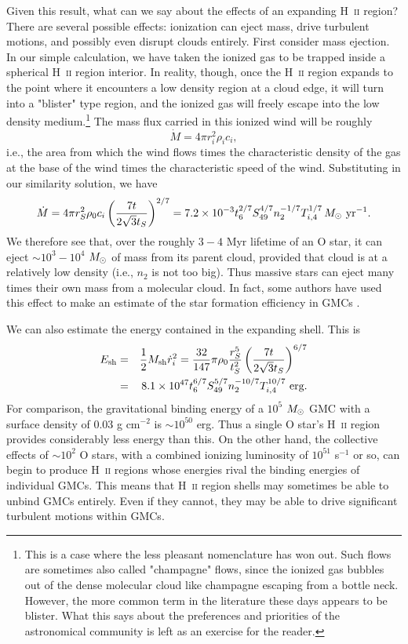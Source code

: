 Given this result, what can we say about the effects of an expanding H~\textsc{ii} region? There are several possible effects: ionization can eject mass, drive turbulent motions, and possibly even disrupt clouds entirely. First consider mass ejection. In our simple calculation, we have taken the ionized gas to be trapped inside a spherical H~\textsc{ii} region interior. In reality, though, once the H~\textsc{ii} region expands to the point where it encounters a low density region at a cloud edge, it will turn into a "blister" type region, and the ionized gas will freely escape into the low density medium.\footnote{This is a case where the less pleasant nomenclature has won out. Such flows are sometimes also called "champagne" flows, since the ionized gas bubbles out of the dense molecular cloud like champagne escaping from a bottle neck. However, the more common term in the literature these days appears to be blister. What this says about the preferences and priorities of the astronomical community is left as an exercise for the reader.} The mass flux carried in this ionized wind will be roughly
\begin{equation}
\dot{M} = 4\pi r_i^2 \rho_i c_i,
\end{equation}
i.e., the area from which the wind flows times the characteristic density of the gas at the base of the wind times the characteristic speed of the wind. Substituting in our similarity solution, we have
\begin{equation}
\dot{M} = 4\pi r_S^2 \rho_0 c_i \left(\frac{7t}{2\sqrt{3} t_S}\right)^{2/7} = 7.2\times 10^{-3} t_6^{2/7} S_{49}^{4/7} n_2^{-1/7} T_{i,4}^{1/7}\,M_{\odot}\mbox{ yr}^{-1}.
\end{equation}
We therefore see that, over the roughly $3-4$ Myr lifetime of an O star, it can eject $\sim 10^3 - 10^4$ $M_{\odot}$ of mass from its parent cloud, provided that cloud is at a relatively low density (i.e., $n_2$ is not too big). Thus massive stars can eject many times their own mass from a molecular cloud. In fact, some authors have used this effect to make an estimate of the star formation efficiency in GMCs \citep[e.g.,][]{matzner02a}.

We can also estimate the energy contained in the expanding shell. This is
\begin{eqnarray}
E_{\rm sh} & = & \frac{1}{2} M_{\rm sh} \dot{r}_i^2 = \frac{32}{147}\pi \rho_0 \frac{r_S^5}{t_S^2} \left(\frac{7t}{2\sqrt{3} t_S}\right)^{6/7}
\nonumber \\
& = & 8.1\times 10^{47} t_6^{6/7} S_{49}^{5/7} n_2^{-10/7} T_{i,4}^{10/7}\mbox{ erg}.
\end{eqnarray}
For comparison, the gravitational binding energy of a $10^5$ $M_{\odot}$ GMC with a surface density of $0.03$ g cm$^{-2}$ is $\sim 10^{50}$ erg. Thus a single O star's H~\textsc{ii} region provides considerably less energy than this. On the other hand, the collective effects of $\sim 10^2$ O stars, with a combined ionizing luminosity of $10^{51}$ s$^{-1}$ or so, can begin to produce H~\textsc{ii} regions whose energies rival the binding energies of individual GMCs. This means that H~\textsc{ii} region shells may sometimes be able to unbind GMCs entirely. Even if they cannot, they may be able to drive significant turbulent motions within GMCs.

